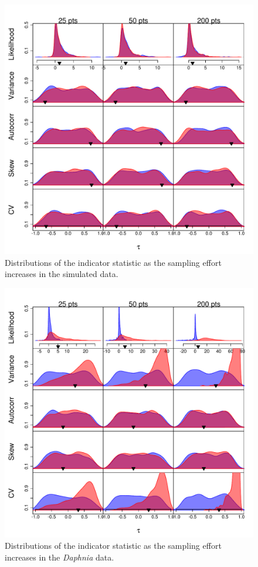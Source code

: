 \documentclass[authoryear,review,11pt]{elsarticle}
\begin{document}
\begin{figure}[ht]
  \begin{center}
    \includegraphics{FigS2.pdf}
  \end{center}
  \caption{Distributions of the indicator statistic as the sampling effort increases in the simulated data.}
  \label{fig:S2}
\end{figure}


\begin{figure}[ht]
  \begin{center}
    \includegraphics{FigS3.pdf}
  \end{center}
  \caption{Distributions of the indicator statistic as the sampling effort increases in the \emph{Daphnia} data.}
  \label{fig:S3}
\end{figure}
\end{document}
